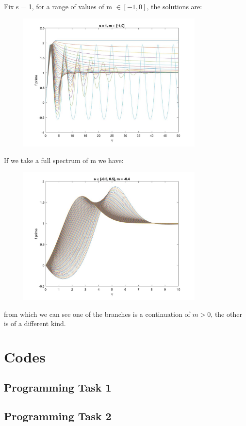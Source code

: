 \documentclass[a4paper,11pt]{article}
\begin{document}
Fix s = 1, for a range of values of m $\in [-1,0]$, the solutions are:
\begin{figure}[H]
\includegraphics[width = \textwidth, height = 7cm]{Q4(7).jpg}
\end{figure}
If we take a full spectrum of m we have:
\begin{figure}[H]
\includegraphics[width = \textwidth, height = 7cm]
{Q4(8).jpg}
\end{figure}
from which we can see one of the branches is a continuation of $m>0$, the other is of a different kind.









\newpage
\section{Codes} 
\subsection{Programming Task 1} \label{Progtsk}
 
\subsection{Programming Task 2} \label{S_finder}



\newpage
\end{document}
